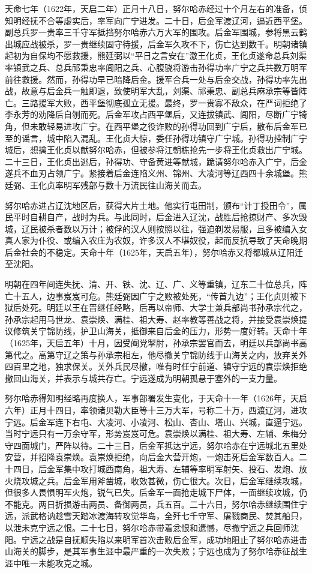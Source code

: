 天命七年（1622年，天启二年）正月十八日，努尔哈赤经过十个月左右的准备，侦知明经抚不合等虚实后，率军向广宁进发。二十日，后金军渡辽河，逼近西平堡。副总兵罗一贵率三千守军抵挡努尔哈赤六万大军的围攻。后金军围城，参将黑云鹤出城应战被杀，罗一贵继续固守待援，后金军久攻不下，伤亡达到数千。明朝诸镇起初为自保均不愿救援，熊廷弼以“平日之言安在”激王化贞，王化贞遂命总兵刘渠率镇武之兵、总兵祁秉忠率闾阳之兵、心腹骁将游击孙得功率广宁之兵共数万明军前往救援。然而，孙得功早已暗降后金。援军合兵一处与后金交战，孙得功率先出战，故意与后金兵一触即退，致使明军大乱，刘渠、祁秉忠、副总兵麻承宗等皆阵亡。三路援军大败，西平堡彻底孤立无援。最终，罗一贵寡不敌众，在严词拒绝了李永芳的劝降后自刎而死。后金军攻占西平堡后，又连拔镇武、闾阳，尽断广宁犄角，但未敢轻易进攻广宁。在西平堡之役诈败的孙得功回到广宁后，散布后金军已至的谣言，城中陷入混乱。王化贞大惊，委任孙得功镇守广宁城。孙得功控制广宁城后，想擒王化贞以献努尔哈赤，但被参将江朝栋抢先一步将王化贞救出广宁城。二十三日，王化贞出逃后，孙得功、守备黄进等献城，跪请努尔哈赤入广宁，后金遂兵不血刃占领广宁。紧接着后金连陷义州、锦州、大凌河等辽西四十余城堡。熊廷弼、王化贞率明军残部与数十万流民往山海关而去。

努尔哈赤进占辽沈地区后，获得大片土地。他实行屯田制，颁布“计丁授田令”，属民平时自耕自产，战时为兵。与此同时，后金进入辽沈，战胜后抢掠财产、多次毁城，辽民被杀者数以万计；被俘的汉人则按照以往，强迫剃发易服，且多被编入女真人家为仆役、或编入农庄为农奴，许多汉人不堪奴役，起而反抗导致了天命晚期后金社会的不稳定。天命十年（1625年，天启五年），努尔哈赤又将都城从辽阳迁至沈阳。

明朝在四年间连失抚、清、开、铁、沈、辽、广、义等重镇，辽东二十位总兵，阵亡十五人，边事岌岌可危。熊廷弼因广宁之败被处死，“传首九边”；王化贞则被下狱后处死。明廷以王在晋继任经略，后再以帝师、大学士兼兵部尚书孙承宗代之，孙承宗起用马世龙、袁崇焕、满桂、祖大寿、赵率教等善战之将，并接受袁崇焕提议修筑关宁锦防线，护卫山海关，抵御来自后金的压力，形势一度好转。天命十年（1625年，天启五年）十月，因受阉党掣肘，孙承宗罢官而去，明廷以兵部尚书高第代之。高第守辽之策与孙承宗相左，他尽撤关宁锦防线于山海关之内，放弃关外四百里之地，独求保关。关外兵民尽撤，唯有时任宁前道、镇守宁远的袁崇焕拒绝撤回山海关，并表示与城共存亡。宁远遂成为明朝孤悬于塞外的一支力量。

努尔哈赤得知明经略再度换人，军事部署发生变化，于天命十一年（1626年，天启六年）正月十四日，率领诸贝勒大臣等十三万大军，号称二十万，西渡辽河，进攻宁远。后金军连下右屯、大凌河、小凌河、松山、杏山、塔山、兴城，直逼宁远。当时宁远只有一万余守军，形势岌岌可危。袁崇焕以满桂、祖大寿、左辅、朱梅分守四面城门，严阵以待。二十三日，后金军抵达宁远，努尔哈赤在宁远城北五里处安营，并招降袁崇焕。袁崇焕拒绝，向后金大营开炮，一炮击死后金军数百人。二十四日，后金军集中攻打城西南角，祖大寿、左辅等率明军射矢、投石、发炮、放火烧攻城之兵。后金军用斧凿城，收效甚微，伤亡很大。次日，后金军继续攻城，但很多人畏惧明军火炮，锐气已失。后金军一面抢走城下尸体，一面继续攻城，仍不能克。两日折损游击两员、备御两员，兵五百。二十六日，努尔哈赤继续围住宁远，派武格讷趁雪天踏冰渡海转攻觉华岛，全歼七千守军、屠戮商民、焚其船只，以泄未克宁远之恨。二十七日，努尔哈赤带着忿恨和遗憾，尽撤宁远之兵回师沈阳。宁远之战是自抚顺失陷以来明军首次击败后金军，成功地阻止了努尔哈赤进击山海关的脚步，是其军事生涯中最严重的一次失败；宁远也成为了努尔哈赤征战生涯中唯一未能攻克之城。

